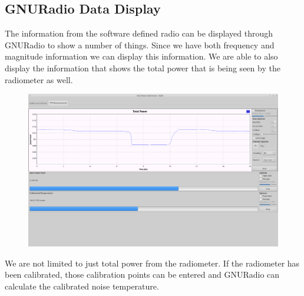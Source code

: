 
\subsection{GNURadio Data Display}
The information from the software defined radio can be displayed through GNURadio to show a number of things.  Since we have both frequency and magnitude information we can display this information.  We are able to also display the information that shows the total power that is being seen by the radiometer as well.

{\begin{figure}[h!tb] 
\centering
\includegraphics[width=17cm]{Images/Lab1_TPR_at_end_exp.png}
\label{radiometer_tpr_display}
\end{figure}
}

We are not limited to just total power from the radiometer.  If the radiometer has been calibrated, those calibration points can be entered and GNURadio can calculate the calibrated noise temperature.  


